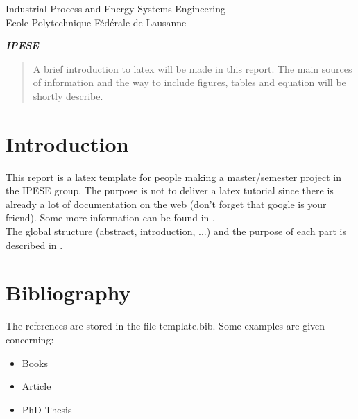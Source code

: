 \documentclass[a4paper,12pt]{article}
\begin{document}
\begin{titlepage}
\begin{center}
\begin{minipage}{0.6\textwidth}
\small{Industrial Process and Energy Systems Engineering}\\
\small{Ecole Polytechnique F\'ed\'erale de Lausanne}
\end{minipage}
\begin{minipage}{0.3\textwidth}
\begin{flushright}
\large{\textbf{\textit{IPESE}}}
\end{flushright}
\end{minipage}
 \end{center}
\end{titlepage}

\newpage
\begin{abstract}
A brief introduction to latex will be made in this report. The main sources of information and the way to include figures, tables and equation will be shortly describe.
\end{abstract}
\newpage
\tableofcontents
\newpage

\section{Introduction}
This report is a latex template for people making a master/semester project in the IPESE group. The purpose is not to deliver a latex tutorial since there is already a lot of documentation on the web (don't forget that google is your friend). Some more information can be found in \cite{wiki, tut}.\\
The global structure (abstract, introduction, ...) and the purpose of each part is described in \cite{baumann,guidelines}. %

\section{Bibliography}
The references are stored in the file template.bib. Some examples are given concerning:
\begin{itemize}
 \item Books \cite{kehlhofer:combined-cycle}
 \item Article \cite{bolland.kvamsdal.ea:comparison}
 \item PhD Thesis \cite{bolland.kvamsdal.ea:comparison}
\end{itemize}
\end{document}
